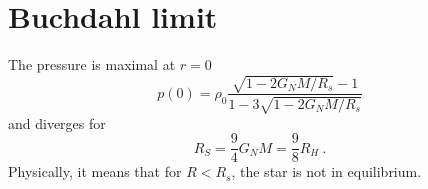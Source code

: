 \section{Buchdahl limit}
    The pressure is maximal at $r=0$ 
    \begin{equation*}
        p (0) = \rho_0 \frac{\sqrt{1 - 2 G_N M / R_s} - 1}{1 - 3 \sqrt{1 - 2 G_N M / R_s}}
    \end{equation*}
    and diverges for 
    \begin{equation*}
        R_S = \frac{9}{4} G_N M = \frac{9}{8} R_H ~.
    \end{equation*}
    Physically, it means that for $R < R_s$, the star is not in equilibrium.
    